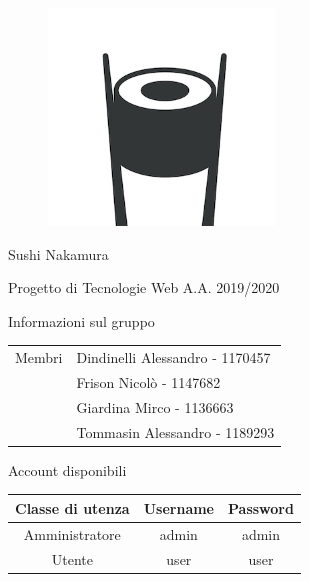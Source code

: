 \documentclass{article}
\begin{document}
	\begin{titlepage}
		\begin{figure}[http]
			\centering
			\includegraphics[width=6cm]{logo.jpg}
		\end{figure}
	
		\vspace*{2cm}
		
		{\huge\bfseries\centerline{Sushi Nakamura} }
		\centerline{Progetto di Tecnologie Web A.A. 2019/2020}
		
		\vspace*{1cm}
		{\bfseries \centerline{Informazioni sul gruppo}}
		\begin{center}
			\begin{tabular}{ c|l } 
				Membri & Dindinelli Alessandro - 1170457\\ 
				& Frison Nicolò - 1147682\\ 
				& Giardina Mirco - 1136663\\
				& Tommasin Alessandro - 1189293\\ 
			\end{tabular}
		\end{center}
		\vspace*{2cm}
		{\bfseries \centerline{Account disponibili}}
		\begin{center}
			\begin{tabular}{ c|c|c } 
			\textbf{Classe di utenza} & \textbf{Username} & \textbf{Password} \\
				\hline
				 Amministratore &  admin &  admin  \\ 
				\hline
				 Utente &  user &  user  \\ 
				\hline
			\end{tabular}
		\end{center}
		\vspace*{\fill}
		
	\end{titlepage}
	
\end{document}
